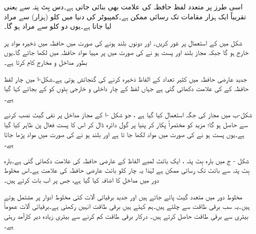 اسی طرز پر متعدد لفظ  حافظہ کی علامت   بھی بنائی جاتی ہے۔دس بِٹ پتہ سے     یعنی  تقریباً ایک ہزار مقامات تک رسائی ممکن ہے۔کمپیوٹر کی دنیا  میں  کلو (ہزار) سے مراد     لیا جاتا ہے۔یوں دو  کلو سے مراد   ہو گا۔


شکل   میں    کے استعمال  پر غور کریں۔ اور     دونوں بلند ہونے کی صورت میں  حافظہ میں ذخیرہ مواد    پر خارج ہو گا جبکہ  مجاز بلند اور     پست ہو نے  کی صورت میں   پر  مہیا مواد حافظہ میں لکھا جائے گا۔یوں  بطور مداخل و مخارج   کام کرتا ہے۔

جدید عارضی حافظہ میں کثیر تعداد  کے الفاظ ذخیرہ کرنے کی گنجائش ہوتی ہے۔شکل-ا میں چار  لفظ  حافظہ کے  کی علامت دکھائی گئی ہے  جہاں لفظ کے چار داخلی  و خارجی بِٹوں  کو  کے بجائے  کہا گیا ہے۔

شکل-ب  میں مجاز کی جگہ  استعمال کیا گیا ہے ، جو شکل -ا کے مجاز مداخل پر نفی گیٹ نصب کرنے سے حاصل  ہو گا؛  مزید     کو مختصراً     پکار کر   پنیا پر گول دائرہ  ڈال کر اس کا  پست فعال  پن ظاہر کیا گیا ہے۔یوں  پست ہو نے کی صورت میں مواد لکھا جا تا ہے اور بلند ہو نے کی صورت میں     مواد پڑھا جاتا ہے۔

شکل - ج میں  بارہ بِٹ پتہ ،  ایک بائٹ لمبے الفاظ کے عارضی حافظہ کی علامت دکھائی گئی ہے۔بارہ بِٹ پتہ سے   بائٹ تک رسائی ممکن ہے لہٰذا  یہ چار کلو بائٹ عارضی حافظہ کی   علامت ہے۔اس مخلوط دور میں   مداخل کا اضافہ کیا گیا ہے، جس پر اب بات کرتے ہیں۔


 مخلوط دور میں متعدد  گیٹ پائے جاتے ہیں اور جدید  برقیاتی  آلات کئی مخلوط ادوار پر مشتمل ہوتے ہیں۔یہ سب  برقی طاقت سے چلتے ہیں۔ہم کہتے ہیں برقی طاقت انہیں  رکھتی  ہے۔برقیاتی  آلات عموماً  بیٹری سے برقی طاقت حاصل کرتے ہیں۔ درکار برقی طاقت کم  کرنے سے بیٹری زیادہ دیر کارآمد رہتی ہے۔
 
